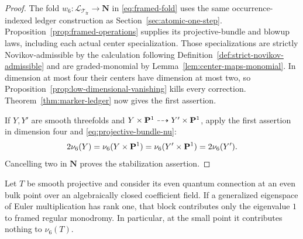 \begin{proof}
The fold \(w_6:\mathcal L_{\mathcal T_{\mathrm{fr}}}\to\mathbf N\) in
\eqref{eq:framed-fold} uses the same occurrence-indexed ledger construction as
Section~\ref{sec:atomic-one-step}.  Proposition~\ref{prop:framed-operations}
supplies its projective-bundle and blowup laws, including each actual center
specialization.  Those specializations are strictly Novikov-admissible by the
calculation following Definition~\ref{def:strict-novikov-admissible} and are
graded-monomial by Lemma~\ref{lem:center-maps-monomial}.  In dimension at
most four their centers have dimension at most two, so
Proposition~\ref{prop:low-dimensional-vanishing} kills every correction.
Theorem~\ref{thm:marker-ledger} now gives the first assertion.

If \(Y,Y'\) are smooth threefolds and
\(Y\times\mathbf P^1\dashrightarrow Y'\times\mathbf P^1\), apply the first assertion in
dimension four and \eqref{eq:projective-bundle-nu}:
\[
 2\nu_6(Y)=\nu_6(Y\times\mathbf P^1)
 =\nu_6(Y'\times\mathbf P^1)=2\nu_6(Y').
\]
Cancelling two in \(\mathbf N\) proves the stabilization assertion.
\end{proof}

\begin{lemma}\label{lem:simple-euler-block}
%
%
Let $T$ be smooth projective and consider its even quantum connection at an
even bulk point over an algebraically closed coefficient field.  If a
generalized eigenspace of Euler multiplication has rank one, that block
contributes only the eigenvalue $1$ to framed regular monodromy.  In
particular, at the small point it contributes nothing to $\nu_6(T)$.
\end{lemma}

